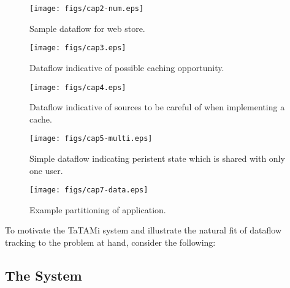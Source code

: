 \documentclass[msc,oneside]{ubcthesis}
\begin{document}
\begin{figure}[ht]
  \begin{center}
    \texttt{[image: figs/cap2-num.eps]}
    \caption[Sample dataflow for web store.]{\label{fig:cap2} Sample dataflow for web store.}
  \end{center}
\end{figure}

\begin{figure}[ht]
  \begin{center}
    \texttt{[image: figs/cap3.eps]}
    \caption[Dataflow indicative of possible caching opportunity.]{\label{fig:cap3} Dataflow indicative of possible caching opportunity.}
  \end{center}
\end{figure}

\begin{figure}[ht]
  \begin{center}
    \texttt{[image: figs/cap4.eps]}
    \caption[Dataflow indicative of sources to be careful of when implementing a cache.]{\label{fig:cap4} Dataflow indicative of sources to be careful of when implementing a cache.}
  \end{center}
\end{figure}

\begin{figure}[ht]
  \begin{center}
    \texttt{[image: figs/cap5-multi.eps]}
    \caption[Simple dataflow indicating peristent state which is shared with only one user.]{\label{fig:cap5} Simple dataflow indicating peristent state which is shared with only one user.}
  \end{center}
\end{figure}	

\begin{figure}[ht]
  \begin{center}
    \texttt{[image: figs/cap7-data.eps]}
    \caption[Example partitioning of application.]{\label{fig:cap7} Example partitioning of application.}
  \end{center}
\end{figure}
	
To motivate the TaTAMi system and illustrate the natural fit of dataflow tracking to the problem at hand, consider the following:

\subsection{The System}
\end{document}
